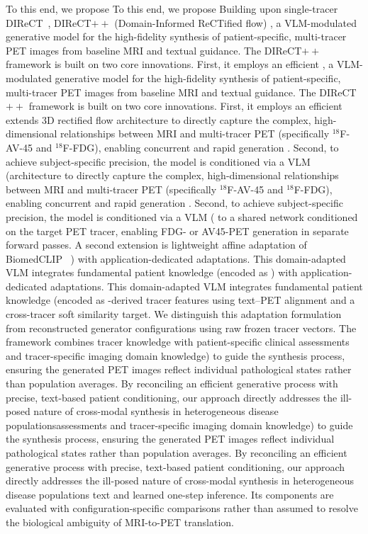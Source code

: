 \documentclass{article}
\providecommand{\DIFaddtex}[1]{{\protect\color{blue} \sf #1}} %
\providecommand{\DIFdeltex}[1]{{\protect\color{red} \ifmmode #1\else\scriptsize #1\fi}} %
\providecommand{\DIFaddbegin}{} %
\providecommand{\DIFaddend}{} %
\providecommand{\DIFdelbegin}{} %
\providecommand{\DIFdelend}{} %
\providecommand{\DIFadd}[1]{\texorpdfstring{\DIFaddtex{#1}}{#1}} %
\providecommand{\DIFdel}[1]{\texorpdfstring{\DIFdeltex{#1}}{}} %
\newcommand{\DIFscaledelfig}{0.5}
\newlength{\DIFdelgraphicswidth} %
\newlength{\DIFdelgraphicsheight} %
\newcommand{\DIFaddincludegraphics}[2][]{{\color{blue}\fbox{\DIFOincludegraphics[#1]{#2}}}} %
\newcommand{\DIFdelincludegraphics}[2][]{%
\sbox{\DIFdelgraphicsbox}{\DIFOincludegraphics[#1]{#2}}%
\settoboxwidth{\DIFdelgraphicswidth}{\DIFdelgraphicsbox} %
\settoboxtotalheight{\DIFdelgraphicsheight}{\DIFdelgraphicsbox} %
\scalebox{\DIFscaledelfig}{%
\parbox[b]{\DIFdelgraphicswidth}{\usebox{\DIFdelgraphicsbox}\\[-\baselineskip] \rule{\DIFdelgraphicswidth}{0em}}\llap{\resizebox{\DIFdelgraphicswidth}{\DIFdelgraphicsheight}{%
\setlength{\unitlength}{\DIFdelgraphicswidth}%
\begin{picture}(1,1)%
\thicklines\linethickness{2pt} %
{\color[rgb]{1,0,0}\put(0,0){\framebox(1,1){}}}%
{\color[rgb]{1,0,0}\put(0,0){\line( 1,1){1}}}%
{\color[rgb]{1,0,0}\put(0,1){\line(1,-1){1}}}%
\end{picture}%
}\hspace*{3pt}}} %
} %
\DeclareRobustCommand{\DIFaddbegin}{\DIFOaddbegin \let\includegraphics\DIFaddincludegraphics} %
\DeclareRobustCommand{\DIFaddend}{\DIFOaddend \let\includegraphics\DIFOincludegraphics} %
\DeclareRobustCommand{\DIFdelbegin}{\DIFOdelbegin \let\includegraphics\DIFdelincludegraphics} %
\DeclareRobustCommand{\DIFdelend}{\DIFOaddend \let\includegraphics\DIFOincludegraphics} %
\begin{document}
\DIFdelbegin \DIFdel{To this end, we propose }\DIFdelend \DIFaddbegin \DIFadd{Building upon single-tracer DIReCT~\cite{liu2025direct}, }\DIFaddend DIReCT$++$ (Domain-Informed ReCTified flow) \DIFdelbegin \DIFdel{, a VLM-modulated generative model for the high-fidelity synthesis of patient-specific, multi-tracer PET images from baseline MRI and textual guidance. The DIReCT$++$ framework is built on two core innovations. First, it employs an efficient }\DIFdelend \DIFaddbegin \DIFadd{extends }\DIFaddend 3D rectified flow \DIFdelbegin \DIFdel{architecture to directly capture the complex, high-dimensional relationships between MRI and multi-tracer PET (specifically $^{18}$F-AV-45 and $^{18}$F-FDG), enabling concurrent and rapid generation . Second, to achieve subject-specific precision, the model is conditioned via a VLM (}\DIFdelend \DIFaddbegin \DIFadd{to a shared network conditioned on the target PET tracer, enabling FDG- or AV45-PET generation in separate forward passes. A second extension is lightweight affine adaptation of }\DIFaddend BiomedCLIP~\cite{zhang2025multimodal}\DIFdelbegin \DIFdel{) with application-dedicated adaptations. This domain-adapted VLM integrates fundamental patient knowledge (encoded as }\DIFdelend \DIFaddbegin \DIFadd{-derived tracer features using text--PET alignment and a cross-tracer soft similarity target. We distinguish this adaptation formulation from reconstructed generator configurations using raw frozen tracer vectors. The framework combines tracer knowledge with }\DIFaddend patient-specific clinical \DIFdelbegin \DIFdel{assessments and tracer-specific imaging domain knowledge) to guide the synthesis process, ensuring the generated PET images reflect individual pathological states rather than population averages. By reconciling an efficient generative process with precise, text-based patient conditioning, our approach directly addresses the ill-posed nature of cross-modal synthesis in heterogeneous disease populations}\DIFdelend \DIFaddbegin \DIFadd{text and learned one-step inference. Its components are evaluated with configuration-specific comparisons rather than assumed to resolve the biological ambiguity of MRI-to-PET translation}\DIFaddend .
\end{document}
